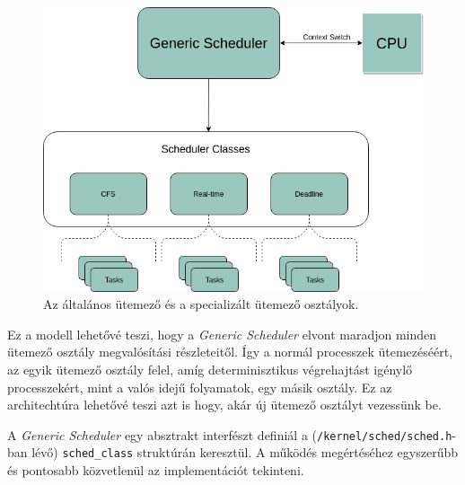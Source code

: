 \begin{figure}[h]
\centering
\includegraphics[width=\textwidth]{images/genericScheduler.png}
\caption{Az általános ütemező és a specializált ütemező osztályok.}
\label{fig:genericScheduler}
\end{figure}

Ez a modell lehetővé teszi, hogy a \textit{Generic Scheduler} elvont maradjon minden ütemező osztály megvalósítási részleteitől. Így a normál processzek ütemezéséért, az egyik ütemező osztály felel, amíg determinisztikus végrehajtást igénylő processzekért, mint a valós idejű folyamatok, egy másik osztály. Ez az architechtúra lehetővé teszi azt is hogy, akár új ütemező osztályt vezessünk be.

A \textit{Generic Scheduler} egy absztrakt interfészt definiál a (\texttt{/kernel/sched/sched.h}-ban lévő) \texttt{sched\_class} struktúrán keresztül. A működés megértéséhez egyszerűbb és pontosabb közvetlenül az implementációt tekinteni.

